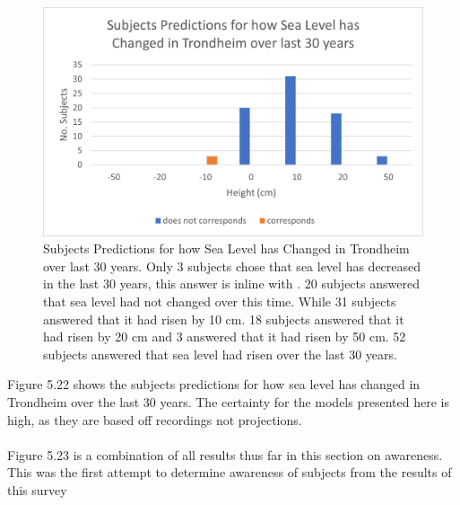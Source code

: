 \begin{figure}[H]
    \centering
    \includegraphics{fig_results/slr-past.png}
    \caption{Subjects Predictions for how Sea Level has Changed in Trondheim over last 30 years. Only 3 subjects chose that sea level has decreased in the last 30 years, this answer is inline with \cite{kartverket_se_2021}. 20 subjects answered that sea level had not changed over this time. While 31 subjects answered that it had risen by 10 cm. 18 subjects answered that it had risen by 20 cm and 3 answered that it had risen by 50 cm. 52 subjects answered that sea level had risen over the last 30 years. }
    \label{fig:my_label}
\end{figure}

Figure 5.22 shows the subjects predictions for how sea level has changed in Trondheim over the last 30 years. The certainty for the models presented here is high, as they are based off recordings not projections. 
\paragraph{}

Figure 5.23 is a combination of all results thus far in this section on awareness. This was the first attempt to determine awareness of subjects from the results of this survey

